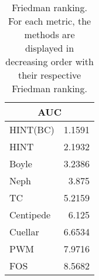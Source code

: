 \documentclass[landscape, 8pt]{report}
\begin{document}
\begin{table}[h!]
\label{tab:ranking}
\vspace{0.0cm}
\begin{center}
\caption{Friedman ranking. For each metric, the methods are displayed in decreasing order with their respective Friedman ranking.}
\renewcommand{\arraystretch}{1.2}
  \begin{tabular}{ |lr| }
    \hline
    \multicolumn{2}{|c|}{\textbf{AUC}} \\
    \hline
    HINT(BC) & 1.1591 \\
    HINT & 2.1932 \\
    Boyle & 3.2386 \\
    Neph & 3.875 \\
    TC & 5.2159 \\
    Centipede & 6.125 \\
    Cuellar & 6.6534 \\
    PWM & 7.9716 \\
    FOS & 8.5682 \\
    \hline
  \end{tabular}
\end{center}
\vspace{0.0cm}
\end{table}
\end{document}
